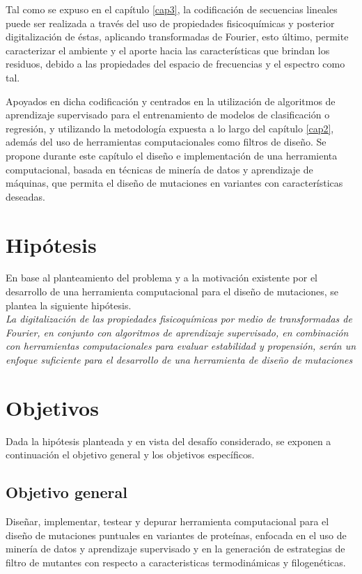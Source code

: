Tal como se expuso en el capítulo \ref{cap3}, la codificación de secuencias lineales puede ser realizada a través del uso de propiedades fisicoquímicas y posterior digitalización de éstas, aplicando transformadas de Fourier, esto último, permite caracterizar el ambiente y el aporte hacia las características que brindan los residuos, debido a las propiedades del espacio de frecuencias y el espectro como tal. 

Apoyados en dicha codificación y centrados en la utilización de algoritmos de aprendizaje supervisado para el entrenamiento de modelos de clasificación o regresión, y utilizando la metodología expuesta a lo largo del capítulo \ref{cap2}, además del uso de herramientas computacionales como filtros de diseño. Se propone durante este capítulo el diseño e implementación de una herramienta computacional, basada en técnicas de minería de datos y aprendizaje de máquinas, que permita el diseño de mutaciones en variantes con características deseadas.

\section{Hipótesis}

En base al planteamiento del problema y a la motivación existente por el desarrollo de una herramienta computacional para el diseño de mutaciones, se plantea la siguiente hipótesis.\\

\textit{La digitalización de las propiedades fisicoquímicas por medio de transformadas de Fourier, en conjunto con algoritmos de aprendizaje supervisado, en combinación con herramientas computacionales para evaluar estabilidad y propensión, serán un enfoque suficiente para el desarrollo de una herramienta de diseño de mutaciones}

\section{Objetivos}

Dada la hipótesis planteada y en vista del desafío considerado, se exponen a continuación el objetivo general y los objetivos específicos.

\subsection{Objetivo general}

Diseñar, implementar, testear y depurar herramienta computacional para el diseño de mutaciones puntuales en variantes de proteínas, enfocada en el uso de minería de datos y
aprendizaje supervisado y en la generación de estrategias de filtro de mutantes con respecto a
caracteristicas termodinámicas y filogenéticas.

